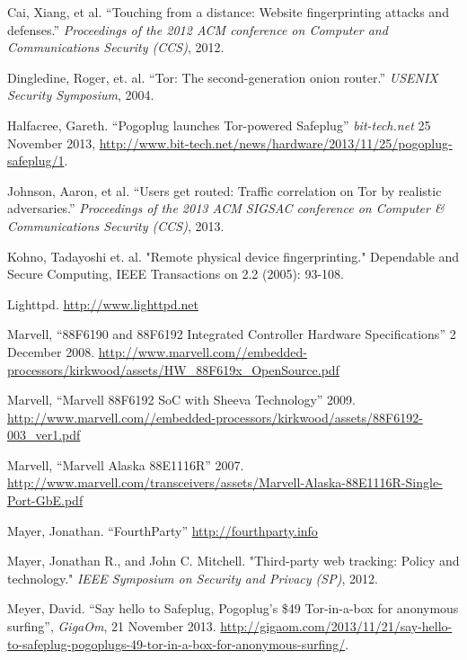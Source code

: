 \begin{thebibliography}{99}

 Cai, Xiang, et al. ``Touching from a distance: Website fingerprinting attacks and defenses.'' \emph{Proceedings of the 2012 ACM conference on Computer and Communications Security (CCS)}, 2012.

 Dingledine, Roger, et. al. ``Tor: The second-generation onion router.'' \emph{USENIX Security Symposium}, 2004.

 Halfacree, Gareth. ``Pogoplug launches Tor-powered Safeplug'' \emph{bit-tech.net} 25 November 2013, \url{http://www.bit-tech.net/news/hardware/2013/11/25/pogoplug-safeplug/1}.

 Johnson, Aaron, et al. ``Users get routed: Traffic correlation on Tor by realistic adversaries.'' \emph{Proceedings of the 2013 ACM SIGSAC conference on Computer \& Communications Security (CCS)}, 2013.

 Kohno, Tadayoshi et. al. "Remote physical device fingerprinting." Dependable and Secure Computing, IEEE Transactions on 2.2 (2005): 93-108.

 Lighttpd. \url{http://www.lighttpd.net}

 Marvell, ``88F6190 and 88F6192 Integrated Controller Hardware Specifications'' 2 December 2008. \url{http://www.marvell.com//embedded-processors/kirkwood/assets/HW_88F619x_OpenSource.pdf}

 Marvell, ``Marvell 88F6192 SoC with Sheeva Technology'' 2009. \url{http://www.marvell.com//embedded-processors/kirkwood/assets/88F6192-003_ver1.pdf}

 Marvell, ``Marvell Alaska 88E1116R'' 2007. \url{http://www.marvell.com/transceivers/assets/Marvell-Alaska-88E1116R-Single-Port-GbE.pdf}

 Mayer, Jonathan. ``FourthParty'' \url{http://fourthparty.info}

 Mayer, Jonathan R., and John C. Mitchell. "Third-party web tracking: Policy and technology." \emph{IEEE Symposium on Security and Privacy (SP)}, 2012.


 Meyer, David. ``Say hello to Safeplug, Pogoplug’s \$49 Tor-in-a-box for anonymous surfing'', \emph{GigaOm}, 21 November 2013. \url{http://gigaom.com/2013/11/21/say-hello-to-safeplug-pogoplugs-49-tor-in-a-box-for-anonymous-surfing/}.


\end{thebibliography}
